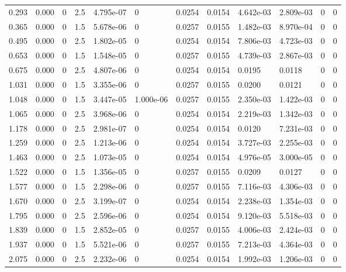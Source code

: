 \documentclass[preview]{standalone}
\begin{document}
{{\begin{tabular}{L{1.2cm}C{1.2cm} C{0.3cm}C{0.5cm} C{1.4cm}C{1.4cm} C{1.4cm}C{1.4cm} C{1.6cm}C{1.6cm} C{1.6cm}C{1.6cm}}
  0.293  &  0.000  & 0     & 2.5 &  4.795e-07  & 0  &  0.0254&   0.0154& 4.642e-03 & 2.809e-03   &  0 & 0  \\ 
  0.365  &  0.000  & 0     & 1.5 &  5.678e-06  & 0  &  0.0257&   0.0155& 1.482e-03 & 8.970e-04   &  0 & 0  \\ 
  0.495  &  0.000  & 0     & 2.5 &  1.802e-05  & 0  &  0.0254&   0.0154& 7.806e-03 & 4.723e-03   &  0 & 0  \\ 
  0.653  &  0.000  & 0     & 1.5 &  1.548e-05  & 0  &  0.0257&   0.0155& 4.739e-03 & 2.867e-03   &  0 & 0  \\ 
  0.675  &  0.000  & 0     & 2.5 &  4.807e-06  & 0  &  0.0254&   0.0154& 0.0195 & 0.0118   &  0 & 0  \\ 
  1.031  &  0.000  & 0     & 1.5 &  3.355e-06  & 0  &  0.0257&   0.0155& 0.0200 & 0.0121   &  0 & 0  \\ 
  1.048  &  0.000  & 0     & 1.5 &  3.447e-05  & 1.000e-06  &  0.0257&   0.0155& 2.350e-03 & 1.422e-03   &  0 & 0  \\ 
  1.065  &  0.000  & 0     & 2.5 &  3.968e-06  & 0  &  0.0254&   0.0154& 2.219e-03 & 1.342e-03   &  0 & 0  \\ 
  1.178  &  0.000  & 0     & 2.5 &  2.981e-07  & 0  &  0.0254&   0.0154& 0.0120 & 7.231e-03   &  0 & 0  \\ 
  1.259  &  0.000  & 0     & 2.5 &  1.213e-06  & 0  &  0.0254&   0.0154& 3.727e-03 & 2.255e-03   &  0 & 0  \\ 
  1.463  &  0.000  & 0     & 2.5 &  1.073e-05  & 0  &  0.0254&   0.0154& 4.976e-05 & 3.000e-05   &  0 & 0  \\ 
  1.522  &  0.000  & 0     & 1.5 &  1.356e-05  & 0  &  0.0257&   0.0155& 0.0209 & 0.0127   &  0 & 0  \\ 
  1.577  &  0.000  & 0     & 1.5 &  2.298e-06  & 0  &  0.0257&   0.0155& 7.116e-03 & 4.306e-03   &  0 & 0  \\ 
  1.670  &  0.000  & 0     & 2.5 &  3.199e-07  & 0  &  0.0254&   0.0154& 2.238e-03 & 1.354e-03   &  0 & 0  \\ 
  1.795  &  0.000  & 0     & 2.5 &  2.596e-06  & 0  &  0.0254&   0.0154& 9.120e-03 & 5.518e-03   &  0 & 0  \\ 
  1.839  &  0.000  & 0     & 1.5 &  2.852e-05  & 0  &  0.0257&   0.0155& 4.006e-03 & 2.424e-03   &  0 & 0  \\ 
  1.937  &  0.000  & 0     & 1.5 &  5.521e-06  & 0  &  0.0257&   0.0155& 7.213e-03 & 4.364e-03   &  0 & 0  \\ 
  2.075  &  0.000  & 0     & 2.5 &  2.232e-06  & 0  &  0.0254&   0.0154& 1.992e-03 & 1.206e-03   &  0 & 0  \\ 

\end{tabular}}}
\end{document}
